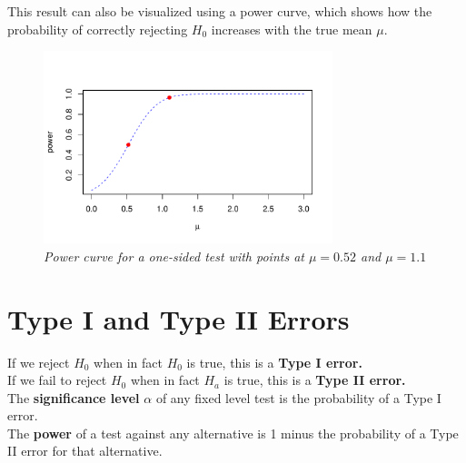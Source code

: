 \begin{example}
\begin{center}
\vspace{0.5em}
\end{center}
This result can also be visualized using a power curve, which shows how the probability of correctly rejecting \( H_0 \) increases with the true mean \( \mu \).
\vspace{-2.50em}
\begin{figure}[H]  %
\centering
\includegraphics[width=0.75\textwidth]{section13/images/power_curve.pdf}
\vspace{-10pt}  %
\caption{\textit{Power curve for a one-sided test with points at $\mu = 0.52$ and $\mu = 1.1$}}
\end{figure}
\end{example}
\section{Type I and Type II Errors}

If we reject $H_0$ when in fact $H_0$ is true, this is a \textbf{Type I error.} \\

If we fail to reject $H_0$ when in fact $H_a$ is true, this is a \textbf{Type II error.} \\

The \textbf{significance level} $\alpha$ of any fixed level test is the probability of a Type I error. \\

The \textbf{power} of a test against any alternative is 1 minus the probability of a Type II error for that alternative. \\

